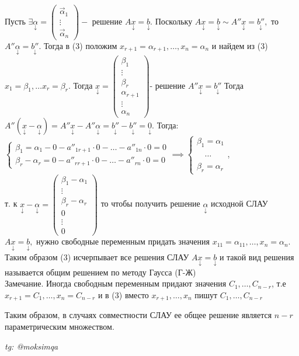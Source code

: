 \documentclass[../main.tex]{subfiles}
\begin{document}
\noindent Пусть $\exists \underset{\downarrow}{\alpha}=\begin{pmatrix} \vec{\alpha}_{1}\\ \vdots\\ \vec{\alpha}_{n} \end{pmatrix} -$ решение $A \underset{\downarrow}{x}=\underset{\downarrow}{b}$. Поскольку $A \underset{\downarrow}{x}=\underset{\downarrow}{b} \sim A'' \underset{\downarrow}{x}=\underset{\downarrow}{b''},$ то $A'' \underset{\downarrow}{\alpha}=\underset{\downarrow}{b''}.$ Тогда в (3) положим $x_{r+1}=\alpha_{r+1},\dots, x_{n}=\alpha_{n}$ и найдем из (3) $x_{1}=\beta_{1},\dots x_{r}=\beta_{r}$.
Тогда $\underset{\downarrow}{x}=\begin{pmatrix}
    \beta_{1}\\
    \vdots \\ 
    \beta_{r}\\
    \alpha_{r+1}\\
    \vdots \\ 
    \alpha_{n}
\end{pmatrix}$- решение $A'' \underset{\downarrow}{x}=\underset{\downarrow}{b''}$
Тогда $A''(\underset{\downarrow}{x}-\underset{\downarrow}{\alpha})=A'' \underset{\downarrow}{x}- A'' \underset{\downarrow}{\alpha}=\underset{\downarrow}{b''}-\underset{\downarrow}{b''}=\underset{\downarrow}{0}$. Тогда: $\begin{cases}\beta_{1}=\alpha_{1}-0-a''_{1r+1}\cdot 0-\dots-a''_{1n}\cdot 0=0\\ \beta_{r}-\alpha_{r }=0-a''_{rr+1}\cdot 0-\dots-a''_{rn}\cdot 0=0\end{cases}\implies \begin{cases}
    \beta_{1}=\alpha_{1}\\ 
    \phantom{\beta_{1}}\dots \\ 
    \beta_{r}=\alpha_{r}
\end{cases}$,\\ т. к $\underset{\downarrow}{x}-\underset{\downarrow}{\alpha}=\begin{pmatrix}
    \beta_{1}-\alpha_{1}\\
    \vdots\\
    \beta_{r}-\alpha_{r}\\
    0\\
    \vdots \\
    0
\end{pmatrix}$
то  чтобы получить решение $\underset{\downarrow}{\alpha}$ исходной СЛАУ $A \underset{\downarrow}{x}=\underset{\downarrow}{b},$ нужно свободные переменным придать значения $x_{11}=\alpha_{11},\dots,x_{n}=\alpha_{n}$. Таким образом (3) исчерпывает все решения СЛАУ $A \underset{\downarrow}{x}= \underset{\downarrow}{b}$ и такой вид решения называется общим решением по методу Гаусса (Г-Ж) 
\\Замечание. Иногда свободным переменным придают значения $C_{1},\dots,C_{n-r}$, т.е $x_{r+1}=C_{1},\dots,x_{n}=C_{n-r}$ и в (3) вместо $x_{r+1},\dots,x_{n}$ пишут $C_{1},\dots,C_{n-r}$

Таким образом, в случаях совместности СЛАУ ее общее решение является $n-r$ параметрическим множеством.



\vspace{1cm}
\begin{flushright}
    \textit{tg: @moksimqa}
\end{flushright}
\end{document}
